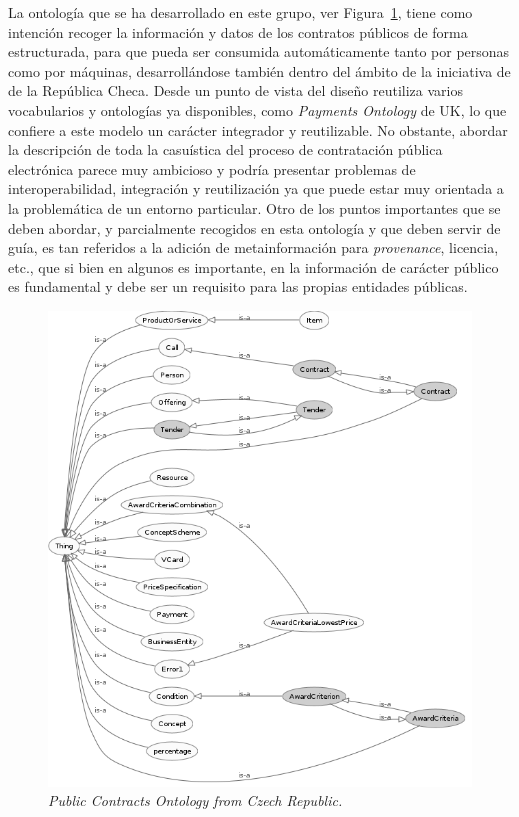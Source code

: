 La ontología que se ha desarrollado en este grupo, ver Figura~\ref{fig:public-contracts-ontology}, tiene como intención recoger
la información y datos de los contratos públicos de forma estructurada, para que pueda ser consumida
automáticamente tanto por personas como por máquinas, desarrollándose también dentro del ámbito
de la iniciativa de \opendata de la República Checa. Desde un punto de vista del diseño reutiliza varios
vocabularios y ontologías ya disponibles, como \textit{Payments Ontology} de UK, lo que confiere a este modelo un carácter integrador y 
reutilizable. No obstante, abordar la descripción de toda la casuística del proceso de contratación pública electrónica parece
muy ambicioso y podría presentar problemas de interoperabilidad, integración y reutilización ya que 
puede estar muy orientada a la problemática de un entorno particular. Otro de los puntos importantes
que se deben abordar, y parcialmente recogidos en esta ontología y que deben servir de guía, es tan referidos a 
la adición de metainformación para \textit{provenance}, licencia, etc., que si bien en algunos
\datasets es importante, en la información de carácter público es fundamental y debe ser un requisito
para las propias entidades públicas.

\begin{figure}[h]
 \centering
    \includegraphics[width=14cm]{images/phd/public-contracts-ontology}
  \caption{\textit{Public Contracts Ontology from Czech Republic.}}
 \label{fig:public-contracts-ontology}
\end{figure}


